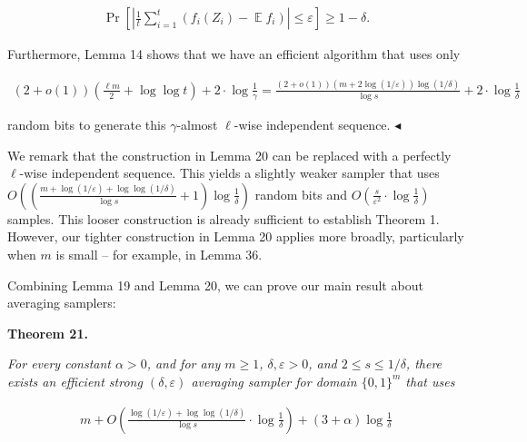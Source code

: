 \documentclass[10pt,a4paper]{article}
\begin{document}
\[\begin{gathered}
\Pr\left[\left|\frac{1}{t}\sum_{i=1}^{t}(f_{i}(Z_{i})-\operatorname*{\mathbb{E}}f_{i})\right|\leq\varepsilon\right]\geq 1-\delta.
\end{gathered}\]


Furthermore, Lemma 14 shows that we have an efficient algorithm that uses only\par


\[\begin{gathered}
(2+o(1))\left(\frac{\ell m}{2}+\log\log t\right)+2\cdot{\log\frac{1}{\gamma}}={\frac{(2+o(1))(m+2\log(1/\varepsilon))\log(1/\delta)}{\log s}}+2\cdot{\log\frac{1}{\delta}}
\end{gathered}\]


random bits to generate this $\gamma$-almost $\ell$-wise independent sequence.
$\blacktriangleleft$\par




We remark that the construction in Lemma 20 can be replaced with a perfectly $\ell$-wise independent sequence. This yields a slightly weaker sampler that uses
$O\left(\left(\frac{m+\log(1/\varepsilon)+\log\log(1/\delta)}{\log s}+1\right)\log\frac{1}{\delta}\right)$
random bits and
$O\left(\frac{s}{\varepsilon^{2}}\cdot\log\frac{1}{\delta}\right)$
samples.
This looser construction is already sufficient to establish Theorem 1. However, our tighter construction in Lemma 20 applies more broadly, particularly when $m$ is small – for example, in Lemma 36.\par




Combining Lemma 19 and Lemma 20, we can prove our main result about averaging samplers:\par





\par\medskip\noindent\textbf{
\textbf{Theorem 21}\textbf{.}
}\par



\emph{For every constant $\alpha>0$, and for any $m\geq 1$, $\delta,\varepsilon>0$, and $2\leq s\leq 1/\delta$, there exists an efficient strong $(\delta,\varepsilon)$ averaging sampler for domain $\{0,1\}^{m}$ that uses}\par


\[\begin{gathered}
m+O\left(\frac{\log(1/\varepsilon)+\log\log(1/\delta)}{\log s}\cdot\log\frac{1}{\delta}\right)+(3+\alpha)\log\frac{1}{\delta}
\end{gathered}\]
\end{document}
